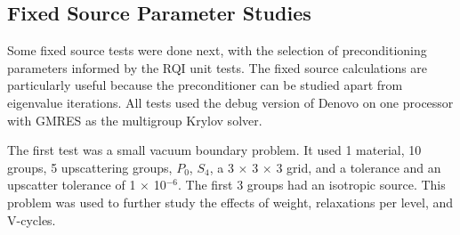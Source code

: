 \subsection{Fixed Source Parameter Studies}
Some fixed source tests were done next, with the selection of preconditioning parameters informed by the RQI unit tests. The fixed source calculations are particularly useful because the preconditioner can be studied apart from eigenvalue iterations. All tests used the debug version of Denovo on one processor with GMRES as the multigroup Krylov solver.

The first test was a small vacuum boundary problem. It used 1 material, 10 groups, 5 upscattering groups, $P_{0}$, $S_{4}$, a 3 $\times$ 3 $\times$ 3 grid, and a tolerance and an upscatter tolerance of 1 $\times$ 10$^{-6}$. The first 3 groups had an isotropic source. This problem was used to further study the effects of weight, relaxations per level, and V-cycles.

